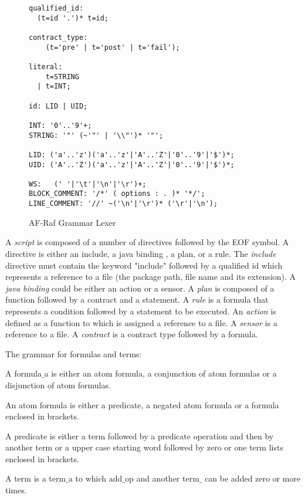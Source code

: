 \documentclass[a4paper,12pt,oneside,fleqn]{book} %
\theoremstyle{plain}
\theoremstyle{definition}
\theoremstyle{remark}
\begin{document}
\begin{figure}\footnotesize %
\begin{verbatim}
qualified_id:
  (t=id '.')* t=id;

contract_type:
    (t='pre' | t='post' | t='fail');

literal:
    t=STRING 
  | t=INT;

id: LID | UID;

INT: '0'..'9'+;
STRING: '"' (~'"' | '\\"')* '"';  

LID: ('a'..'z')('a'..'z'|'A'..'Z'|'0'..'9'|'$')*;
UID: ('A'..'Z')('a'..'z'|'A'..'Z'|'0'..'9'|'$')*;

WS:   (' '|'\t'|'\n'|'\r')+;
BLOCK_COMMENT: '/*' ( options : . )* '*/';
LINE_COMMENT: '//' ~('\n'|'\r')* ('\r'|'\n');

\end{verbatim}
\caption{AF-Raf Grammar Lexer}
\label{fig:Grammar-lexer}
\end{figure} %

A \textit{script} is composed of a number of directives followed by the EOF
symbol.  A directive is either an include, a java binding , a plan, or a
rule. The \textit{include} directive must contain the keyword "include"
followed by a qualified id which represents a reference to a file (the
package path, file name and its extension). A \textit{java binding} could
be either an action or a sensor. A \textit{plan} is composed of a function
followed by a contract and a statement. A \textit{rule} is a formula that
represents a condition followed by a statement to be executed. An
\textit{action} is defined as a function to which is assigned a reference
to a file. A \textit{sensor} is a reference to a file.  A \textit{contract}
is a contract type followed by a formula.


The grammar for formulas and terms:


A formula$\_$a is either an atom formula, a conjunction of atom formulas or a
disjunction of atom formulas.

An atom formula is either a predicate, a negated atom formula or a formula
enclosed in brackets.

A predicate is either a term followed by a predicate operation and then by another
term or a upper case starting word followed by zero or one term lists
enclosed in brackets.


A term is a term$\_$a to which add$\_$op and another term$\_$ can be added zero or
more times. 
\end{document}
